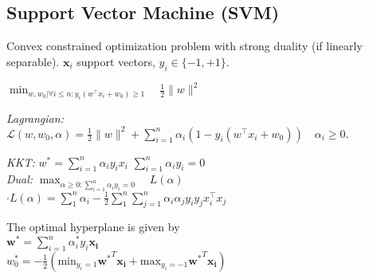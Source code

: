 

\subsection*{Support Vector Machine (SVM)}
Convex constrained optimization problem with strong duality (if linearly separable). 
$\mathbf{x}_i$ support vectors, $y_i {\in} \{-1,+1\}$.

$\min_{w, w_0| \forall i \leq n: y_i (w^\top x_i + w_0) \geq 1} \quad \frac{1}{2} \|w\|^2$

\textit{Lagrangian:}
$\mathcal{L}(w, w_0, \alpha) {=} \frac{1}{2} \|w\|^2 + \sum_{i=1}^{n} \alpha_i (1 - y_i (w^\top x_i + w_0)) \quad  \alpha_i {\geq} 0.$

\textit{KKT:} $w^* {=} \sum_{i=1}^{n} \alpha_i y_i x_i$ \quad $\sum_{i=1}^{n} \alpha_i y_i {=} 0$ \\
\textit{Dual:} $\max_{\alpha\geq 0: \sum_{i=1}^{n} \alpha_i y_i = 0} \quad L(\alpha)$ \\
$\cdot L(\alpha) {=}\sum_{1}^{n} \alpha_i {-} \frac{1}{2} \sum_{1}^{n} \sum_{j=1}^{n} \alpha_i \alpha_j y_i y_j x_i^\top x_j$

The optimal hyperplane is given by\\
$\mathbf{w^*}=\sum_{i=1}^n\alpha_i^*y_i\mathbf{x_i}$\\
$ w_0^*{=}{-}\frac{1}{2}(\mathrm{min}_{y_i=1}\mathbf{w^*}^T\mathbf{x_i}{+}\mathrm{max}_{y_i=-1}\mathbf{w^*}^T\mathbf{x_i})$\\

